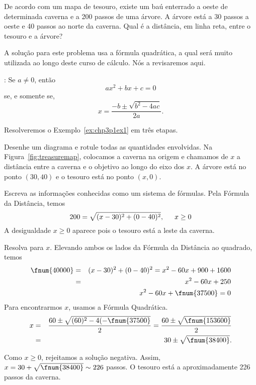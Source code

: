 \begin{example}\label{ex:chp3p1ex1}
De acordo com um mapa de tesouro, existe um baú enterrado a oeste de
determinada caverna e a 200 passos de uma árvore. A árvore está a 30
passos a oeste e 40 passos ao norte da caverna. Qual é a distância, em
linha reta, entre o tesouro e a árvore?

A solução para este problema usa a fórmula quadrática, a qual será muito
utilizada ao longo deste curso de cálculo. Nós a revisaremos aqui.

: Se $a \ne 0$, então
$$
  ax^2 + bx + c = 0
$$
se, e somente se,
$$
  x = \frac{-b \pm \sqrt{b^2 - 4ac}}{2a}.
$$

Resolveremos o Exemplo~\ref{ex:chp3p1ex1} em três etapas.
\begin{stepanalysis}
\item Desenhe um diagrama e rotule todas as quantidades envolvidas. Na
      Figura~\ref{fig:treasuremap}, colocamos a caverna na origem e
      chamamos de $x$ a distância entre a caverna e o objetivo
      ao longo do eixo dos $x$.
      A árvore está no ponto $(30, 40)$ e o tesouro está no ponto $(x, 0)$.
\item Escreva as informações conhecidas como um sistema de fórmulas. Pela
      Fórmula da Distância, temos
      $$
        200 = \sqrt{(x-30)^2 + (0-40)^2}, \hspace{1.5em} x \ge 0
      $$
      A desigualdade $x \ge 0$ aparece pois o tesouro está a leste da
      caverna.
\item Resolva para $x$. Elevando ambos os lados da Fórmula da Distância
      ao quadrado, temos
      \begin{eqnarray*}
        \fnum{40000} & = & (x - 30)^2 + (0 - 40)^2 = x^2 - 60x + 900 + 1600\\
        & = & x^2 - 60x + 250 \\
        &   & x^2 - 60x + \fnum{37500} = 0
      \end{eqnarray*}
      Para encontrarmos $x$, usamos a Fórmula Quadrática.
      \begin{eqnarray*}
        x & = & \frac{60 \pm \sqrt{(60)^2 - 4(-\fnum{37500}}}{2}
          = \frac{60 \pm \sqrt{\fnum{153600}}}2{} \\
        & = & 30 \pm \sqrt{\fnum{38400}}.
      \end{eqnarray*}
\end{stepanalysis}
\begin{interpretsolution}
  Como $x \ge 0$, rejeitamos a solução negativa. Assim,
  $x = 30 + \sqrt{\fnum{38400}} \sim 226$ passos. O tesouro está a
  aproximadamente 226 passos da caverna.
\end{interpretsolution}
\end{example}

